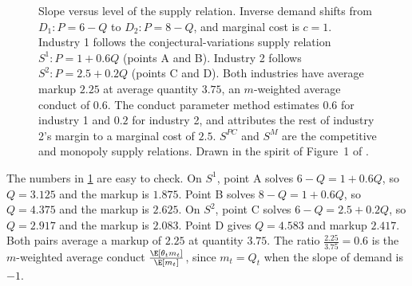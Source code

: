 \begin{figure}[htbp]
\centering
{}
\caption[Slope versus level of the supply relation]{Slope versus level of the supply relation. Inverse demand shifts from
$D_1\colon P = 6 - Q$ to $D_2\colon P = 8 - Q$, and marginal cost is $c = 1$. Industry 1 follows the conjectural-variations
supply relation $S^1\colon P = 1 + 0.6Q$ (points A and B). Industry 2 follows $S^2\colon P = 2.5 + 0.2Q$ (points C and D).
Both industries have average markup $2.25$ at average quantity $3.75$, an $m$-weighted average conduct of $0.6$. The conduct parameter
method estimates $0.6$ for industry 1 and $0.2$ for industry 2, and attributes the rest of industry 2's margin to a
marginal cost of $2.5$. $S^{PC}$ and $S^M$ are the competitive and monopoly supply relations. Drawn in the spirit of
Figure~1 of \citet{Corts1999}.}
\label{fig:03-corts-slope}
\end{figure}

The numbers in \cref{fig:03-corts-slope} are easy to check. On $S^1$, point A solves $6 - Q = 1 + 0.6Q$, so $Q = 3.125$
and the markup is $1.875$. Point B solves $8 - Q = 1 + 0.6Q$, so $Q = 4.375$ and the markup is $2.625$. On $S^2$, point C
solves $6 - Q = 2.5 + 0.2Q$, so $Q = 2.917$ and the markup is $2.083$. Point D gives $Q = 4.583$ and markup $2.417$. Both
pairs average a markup of $2.25$ at quantity $3.75$. The ratio $\frac{2.25}{3.75} = 0.6$ is the $m$-weighted average
conduct $\frac{\E[\theta_t m_t]}{\E[m_t]}$, since $m_t = Q_t$ when the slope of demand is $-1$.

